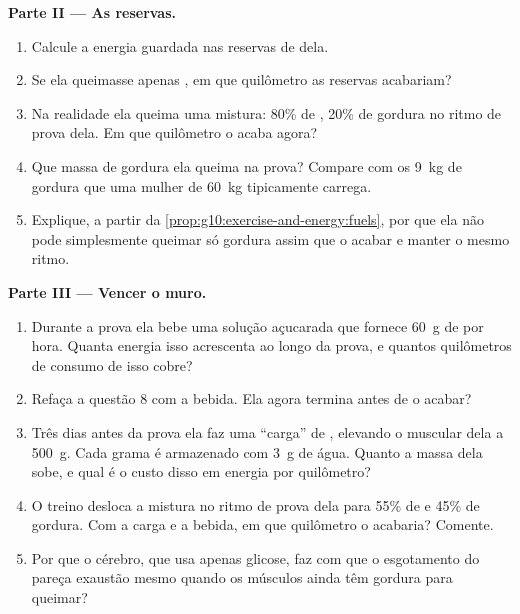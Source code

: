 \begin{problem}
\medskip
\noindent\textbf{Parte II --- As reservas.}
\begin{enumerate}[resume]
  \item Calcule a energia guardada nas reservas de  dela.
  \item Se ela queimasse apenas , em que quilômetro as
        reservas acabariam?
  \item Na realidade ela queima uma mistura: 80\% de , 20\%
        de gordura no ritmo de prova dela. Em que quilômetro o
         acaba agora?
  \item Que massa de gordura ela queima na prova? Compare com os
        \qty{9}{kg} de gordura que uma mulher de \qty{60}{kg}
        tipicamente carrega.
  \item Explique, a partir da
        \cref{prop:g10:exercise-and-energy:fuels}, por que ela não pode
        simplesmente queimar só gordura assim que o  acabar e
        manter o mesmo ritmo.
\end{enumerate}

\medskip
\noindent\textbf{Parte III --- Vencer o muro.}
\begin{enumerate}[resume]
  \item Durante a prova ela bebe uma solução açucarada que fornece
        \qty{60}{g} de  por hora. Quanta energia isso
        acrescenta ao longo da prova, e quantos quilômetros de consumo
        de  isso cobre?
  \item Refaça a questão 8 com a bebida. Ela agora termina antes de o
         acabar?
  \item Três dias antes da prova ela faz uma ``carga'' de ,
        elevando o  muscular dela a \qty{500}{g}. Cada grama
        é armazenado com \qty{3}{g} de água. Quanto a massa dela sobe,
        e qual é o custo disso em energia por quilômetro?
  \item O treino desloca a mistura no ritmo de prova dela para 55\% de
         e 45\% de gordura. Com a carga e a bebida, em que
        quilômetro o  acabaria? Comente.
  \item Por que o cérebro, que usa apenas glicose, faz com que o
        esgotamento do  pareça exaustão mesmo quando os
        músculos ainda têm gordura para queimar?
\end{enumerate}


\end{problem}
